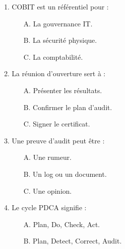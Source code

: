 \begin{enumerate}
    \item COBIT est un référentiel pour :
    \begin{itemize} \item[A.] La gouvernance IT. \item[B.] La sécurité physique. \item[C.] La comptabilité. \end{itemize}
    \item La réunion d'ouverture sert à :
    \begin{itemize} \item[A.] Présenter les résultats. \item[B.] Confirmer le plan d'audit. \item[C.] Signer le certificat. \end{itemize}
    \item Une preuve d'audit peut être :
    \begin{itemize} \item[A.] Une rumeur. \item[B.] Un log ou un document. \item[C.] Une opinion. \end{itemize}
    \item Le cycle PDCA signifie :
    \begin{itemize} \item[A.] Plan, Do, Check, Act. \item[B.] Plan, Detect, Correct, Audit. \end{itemize}
\end{enumerate}

